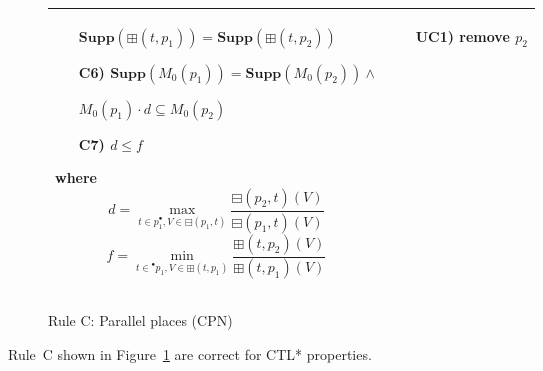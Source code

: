 \begin{figure}[h!]
\begin{adjustbox}{center}
\begin{tabular}{|p{75mm}|p{45mm}|}
\begin{itemize}[leftmargin=10mm]
            $\textbf{Supp}(\boxplus(t, p_1))=\textbf{Supp}(\boxplus(t, p_2))$

            \item[C6)] $\textbf{Supp}(M_0(p_1))=\textbf{Supp}(M_0(p_2))\land$

            $M_0(p_1)\cdot d \subseteq M_0(p_2)$
            \item[C7)] $d\leq f$
        \end{itemize}
        where
        \[
            d = \max_{t\in p_1^\bullet,V\in \boxminus(p_1, t)}\frac{\boxminus(p_2, t)(V)}{\boxminus(p_1, t)(V)}
        \]
        \[
            f = \min_{t\in{}^\bullet p_1,V\in \boxplus(t, p_1)}\frac{\boxplus(t, p_2)(V)}{\boxplus(t, p_1)(V)}
        \]
        &
        \begin{itemize}[leftmargin=10mm]
            \item[UC1)] remove $p_2$
        \end{itemize} \\ \hline
        \end{tabular}
    \end{adjustbox}
    \caption{Rule C: Parallel places (CPN)}
    \label{fig:rule_c_cpn}
\end{figure}

\begin{theorem}
    Rule~C shown in Figure~\ref{fig:rule_c_cpn} are correct for CTL* properties.
\end{theorem}
